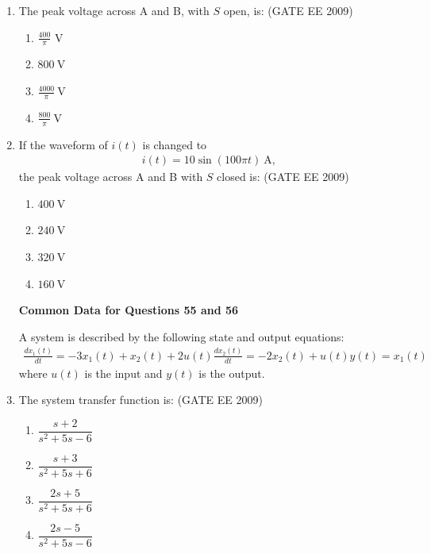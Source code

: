 \documentclass[journal,12pt,onecolumn]{IEEEtran}
\theoremstyle{remark}
\begin{document}
\begin{flushleft}
\begin{enumerate}
\item The peak voltage across A and B, with \(S\) open, is:
\hfill(GATE EE 2009)
\begin{enumerate}
 
\item \(\frac{400}{\pi} \text{ V}\) 
\item  \(800 \ \text{V}\) 
\item  \(\frac{4000}{\pi} \ \text{V}\) 
\item  \(\frac{800}{\pi} \ \text{V}\)
\end{enumerate}

\item If the waveform of \( i(t) \) is changed to
\begin{align*}
i(t) = 10 \sin(100 \pi t) \ \text{A},
\end{align*}
the peak voltage across A and B with \( S \) closed is:
\hfill(GATE EE 2009)
\begin{enumerate}
    

\item \(400 \ \mathrm{V}\) 
\item \(240 \ \mathrm{V}\) 
\item \(320 \ \mathrm{V}\) 
\item  \(160 \ \mathrm{V}\)
\end{enumerate}

\textbf{Common Data for Questions 55 and 56}

A system is described by the following state and output equations:
\begin{align*}
\frac{dx_1(t)}{dt} = -3x_1(t) + x_2(t) + 2u(t)
\frac{dx_2(t)}{dt} = -2x_2(t) + u(t)
y(t) = x_1(t)
\end{align*}
where \(u(t)\) is the input and \(y(t)\) is the output.
 
\item  The system transfer function is:
\hfill(GATE EE 2009)
\begin{enumerate}
    
\item  \(\dfrac{s+2}{s^{2} + 5s - 6}\) 
\item  \(\dfrac{s+3}{s^{2} + 5s + 6}\) 
\item  \(\dfrac{2s+5}{s^{2} + 5s + 6}\)
\item  \(\dfrac{2s - 5}{s^{2} + 5s - 6}\)
\end{enumerate}


\end{enumerate}
\end{flushleft}
\end{document}
